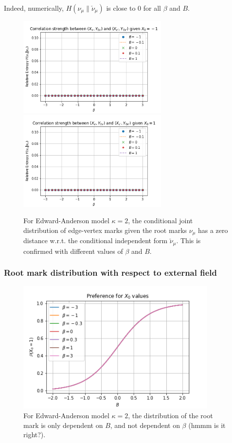 \documentclass[12pt]{article}
\begin{document}
Indeed, numerically, $H(\nu_\mu \| \check{\nu}_\mu)$ is close to $0$ for all $\beta$ and $B$.
\begin{figure}[h]
    \centering
    \includegraphics[width=7.5cm]{img/EA_x1_x2_RelEntr_x0=-1.png}
    \includegraphics[width=7.5cm]{img/EA_x1_x2_RelEntr_x0=1.png}
    \caption{For Edward-Anderson model $\kappa=2$, the conditional joint distribution of edge-vertex marks given the root marks $\nu_\mu$
        has a zero distance w.r.t. the conditional independent form $\check{\nu}_\mu$. This is confirmed with different values of $\beta$ and $B$.}
    \label{Fig.EA-x1-x2-given-x0-rel-entr}
\end{figure}

\subsubsection{Root mark distribution with respect to external field}

\begin{figure}[h]
    \centering
    \includegraphics[width=10cm]{img/EA_x0_B.png}
    \caption{For Edward-Anderson model $\kappa=2$, the distribution of the root mark is only dependent on $B$, and not dependent on $\beta$ (hmmm is it right?). }
    \label{Fig.EA-x0-B}
\end{figure}
\end{document}
